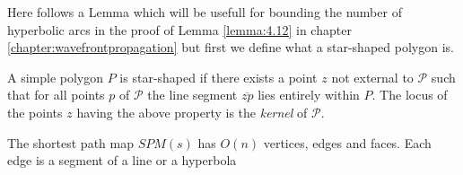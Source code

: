 Here follows a Lemma which will be usefull for bounding the number of hyperbolic arcs in the proof 
of Lemma \ref{lemma:4.12} in chapter \ref{chapter:wavefrontpropagation} but first we define what
a star-shaped polygon is.

\begin{mydef}\cite{PreparataS85}
	\label{star-shaped}
	A simple polygon $P$ is star-shaped if there exists a point $z$ not external
	to $\mathcal{P}$ such that for all points $p$ of $\mathcal{P}$ the line segment 
	$\overline{zp}$ lies entirely within $P$. The locus of the points $z$ having the 
	above property is the \emph{kernel} of $\mathcal{P}$.
\end{mydef}

\begin{Lemma}[Lemma 3.2]
	\label{lemma:3.2}
	The shortest path map $SPM(s)$ has $O(n)$ vertices, edges and faces. Each
	edge is a segment of a line or a hyperbola
\end{Lemma}
